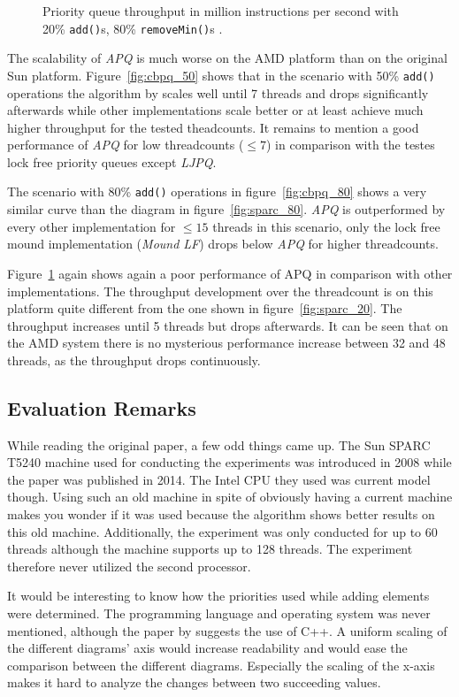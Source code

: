 \begin{figure}[htb]
\begin{minipage}[b]{.495\textwidth}
		\caption{Priority queue throughput in million instructions per second with 20\% \texttt{add()}s, 80\% \texttt{removeMin()}s \cite{braginsky_cbpq:_2016}.}
		\label{fig:cbpq_20}
	\end{minipage}
\end{figure}

The scalability of \textit{APQ} is much worse on the AMD platform than on the original Sun platform. Figure~\ref{fig:cbpq_50} shows that in the scenario with 50\% \texttt{add()} operations the algorithm by \citeauthor{calciu_adaptive_2014} scales well until 7 threads and drops significantly afterwards while other implementations scale better or at least achieve much higher throughput for the tested theadcounts. It remains to mention a good performance of \textit{APQ} for low threadcounts ($\le 7$) in comparison with the testes lock free priority queues except \textit{LJPQ}.

The scenario with 80\% \texttt{add()} operations in figure~\ref{fig:cbpq_80} shows a very similar curve than the diagram in figure~\ref{fig:sparc_80}. \textit{APQ} is outperformed by every other implementation for $\le 15$ threads in this scenario, only the lock free mound implementation (\textit{Mound LF}) drops below \textit{APQ} for higher threadcounts.

Figure~\ref{fig:cbpq_20} again shows again a poor performance of APQ in comparison with other implementations. The throughput development over the threadcount is on this platform quite different from the one shown in figure~\ref{fig:sparc_20}. The throughput increases until 5 threads but drops afterwards. It can be seen that on the AMD system there is no mysterious performance increase between 32 and 48 threads, as the throughput drops continuously. 

\subsection{Evaluation Remarks}

While reading the original paper, a few odd things came up. The Sun SPARC T5240 machine used for conducting the experiments was introduced in 2008 while the paper was published in 2014. The Intel CPU they used was current model though. Using such an old machine in spite of obviously having a current machine makes you wonder if it was used because the algorithm shows better results on this old machine. Additionally, the experiment was only conducted for up to 60 threads although the machine supports up to 128 threads. The experiment therefore never utilized the second processor.

It would be interesting to know how the priorities used while adding elements were determined. The programming language and operating system was never mentioned, although the paper by \citeauthor{braginsky_cbpq:_2016} suggests the use of C++. A uniform scaling of the different diagrams' axis would increase readability and would ease the comparison between the different diagrams. Especially the scaling of the x-axis makes it hard to analyze the changes between two succeeding values.





